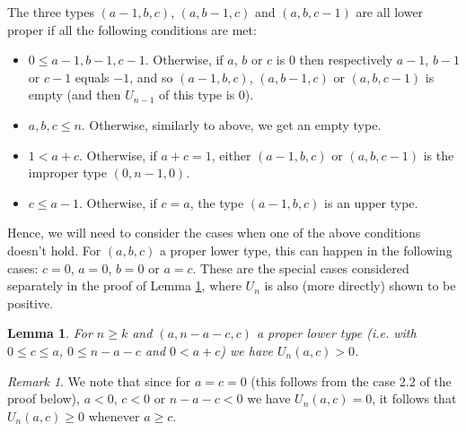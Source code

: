 \documentclass[11pt, reqno]{amsart}
\newcommand{\leanblueprintbase}{https://mj141592.github.io/weighted-chains-paper}
\newif\ifleanlinks
\newcommand{\leanblueprint}[1]{%
  \ifleanlinks
    \leavevmode\unskip\penalty9999\hbox{}\nobreak\hfill\quad
    \href{\leanblueprintbase/theorems/#1/}{%
      \mbox{\normalfont\footnotesize\textcolor{blue}{[\textsf{Lean formalisation}]}}}%
    \par\nobreak
  \fi
}
\newtheorem{lemma}[theorem]{Lemma}
\theoremstyle{remark}
\newtheorem*{remark}{Remark}
\numberwithin{equation}{section}
\newcommand{\uno}{U_{n-1}}
\begin{document}
The three types $(a-1, b, c)$, $(a, b-1, c)$ and $(a, b, c-1)$ are all lower proper if all the following conditions are met:
\begin{itemize}
    \item $0 \leqslant a-1, b-1, c-1$. Otherwise, if $a$, $b$ or $c$ is $0$ then respectively $a-1$, $b-1$ or $c-1$ equals $-1$, and so $(a-1, b, c)$, $(a, b-1, c)$ or $(a, b, c-1)$ is empty (and then $\uno$ of this type is $0$).
    \item $a, b, c \leqslant n$. Otherwise, similarly to above, we get an empty type.
    \item $1 < a+c$. Otherwise, if $a+c=1$, either $(a-1, b, c)$ or $(a, b, c-1)$ is the improper type $(0, n-1, 0)$.
    \item $c \leqslant a-1$. Otherwise, if $c=a$, the type $(a-1, b, c)$ is an upper type.
\end{itemize}
Hence, we will need to consider the cases when one of the above conditions doesn't hold. For $(a, b, c)$ a proper lower type, this can happen in the following cases: $c=0$, $a=0$, $b=0$ or $a=c$. These are the special cases considered separately in the proof of Lemma \ref{wc:lem:ternary-auxiliary-positive}, where $U_n$ is also (more directly) shown to be positive.

\begin{lemma}
\label{wc:lem:ternary-auxiliary-positive}
    For $n \geqslant k$ and $(a, n-a-c, c)$ a proper lower type (i.e. with $0 \leqslant c \leqslant a$, $0 \leqslant n-a-c$ and $0 < a+c$) we have $U_n(a, c)>0$.
\leanblueprint{ternary-auxiliary-positive}
\end{lemma}

\begin{remark}
    We note that since for $a=c=0$ (this follows from the case 2.2 of the proof below), $a<0$, $c<0$ or $n-a-c<0$ we have $U_n(a, c)=0$, it follows that $U_n(a, c) \geqslant 0$ whenever $a \geqslant c$.
\end{remark}
\end{document}

